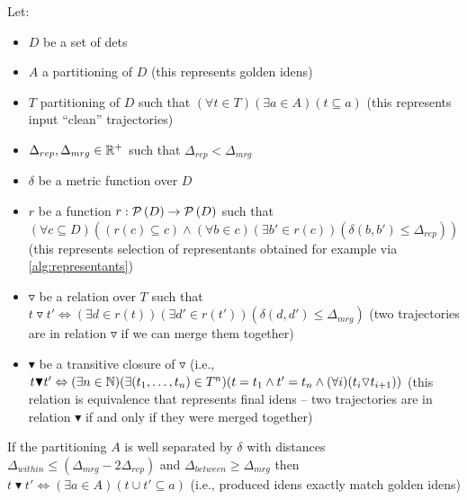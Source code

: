 \begin{claim}
\label{clm:claim}
Let:

\setlength{\itemsep}{0pt}
\setlength{\parskip}{0pt}

\begin{itemize}
    \item $D$ be a set of \glspl{det}
    \item $A$ a partitioning of $D$ (this represents golden \glspl{iden})
    \item $T$ partitioning of $D$ such that $(\forall t \in T) (\exists a \in A) (t \subseteq a)$ (this represents input ``clean'' trajectories)
    \item $\Delta_{rep}, \Delta_{mrg} \in \mathbb{R}^+$ such that $\Delta_{rep} < \Delta_{mrg}$
    \item $\delta$ be a metric function over $D$
    \item $r$ be a function $r: \mathcal{P}\left(D\right) \rightarrow \mathcal{P}\left(D\right)$ such that $(\forall c \subseteq D)((r(c) \subseteq c) \land (\forall b \in c) (\exists b' \in r(c)) (\delta(b, b') \leq \Delta_{rep}))$ (this represents selection of representants obtained for example via \autoref{alg:representants})
    \item $\triangledown$ be a relation over $T$ such that $t\triangledown t' \Leftrightarrow (\exists d \in r(t)) (\exists d' \in r(t')) (\delta(d, d') \leq \Delta_{mrg})$ (two trajectories are in relation $\triangledown$ if we can merge them together)
    \item $\blacktriangledown$ be a transitive closure of $\triangledown$ (i.e., $t \blacktriangledown t' \Leftrightarrow (\exists n \in \mathbb{N}) (\exists (t_1, \ldots, t_n) \in T^n) (t = t_1 \land t' = t_n \land (\forall i) (t_i\triangledown t_{i+1}))$ (this relation is equivalence that represents final \glspl{iden} -- two trajectories are in relation $\blacktriangledown$ if and only if they were merged together)
\end{itemize}

If the partitioning $A$ is well separated by $\delta$ with distances $\Delta_{within} \leq (\Delta_{mrg} - 2\Delta_{rep})$ and $\Delta_{between} \geq \Delta_{mrg}$ then $t\blacktriangledown t' \Leftrightarrow (\exists a \in A) (t \cup t' \subseteq a)$ (i.e., produced \glspl{iden} exactly match golden \glspl{iden})

\end{claim}

